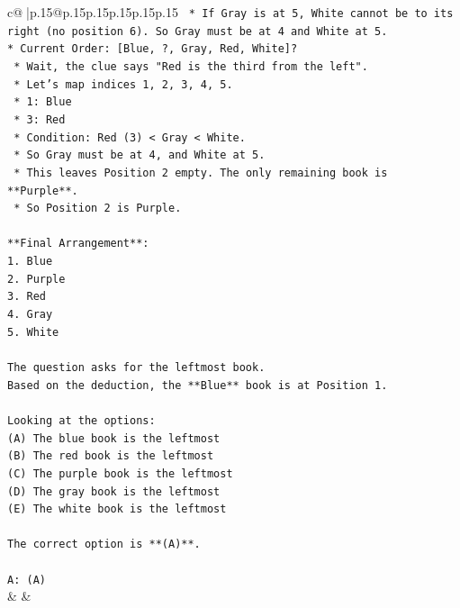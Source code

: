 \documentclass{article}
\begin{document}
{\begin{supertabular}{c@{$\;$}|p{.15\linewidth}@{}p{.15\linewidth}p{.15\linewidth}p{.15\linewidth}p{.15\linewidth}p{.15\linewidth}}
{{{\texttt{    *   If Gray is at 5, White cannot be to its right (no position 6). So Gray must be at 4 and White at 5.} \\
\texttt{*   Current Order: {[}Blue, ?, Gray, Red, White{]}?} \\
\texttt{    *   Wait, the clue says "Red is the third from the left".} \\
\texttt{    *   Let's map indices 1, 2, 3, 4, 5.} \\
\texttt{    *   1: Blue} \\
\texttt{    *   3: Red} \\
\texttt{    *   Condition: Red (3) < Gray < White.} \\
\texttt{    *   So Gray must be at 4, and White at 5.} \\
\texttt{    *   This leaves Position 2 empty. The only remaining book is **Purple**.} \\
\texttt{    *   So Position 2 is Purple.} \\
\\ 
\texttt{**Final Arrangement**:} \\
\texttt{1.  Blue} \\
\texttt{2.  Purple} \\
\texttt{3.  Red} \\
\texttt{4.  Gray} \\
\texttt{5.  White} \\
\\ 
\texttt{The question asks for the leftmost book.} \\
\texttt{Based on the deduction, the **Blue** book is at Position 1.} \\
\\ 
\texttt{Looking at the options:} \\
\texttt{(A) The blue book is the leftmost} \\
\texttt{(B) The red book is the leftmost} \\
\texttt{(C) The purple book is the leftmost} \\
\texttt{(D) The gray book is the leftmost} \\
\texttt{(E) The white book is the leftmost} \\
\\ 
\texttt{The correct option is **(A)**.} \\
\\ 
\texttt{A: (A)} \\
            }
        }
    }
    & & \\ \\


\end{supertabular}}
\end{document}
